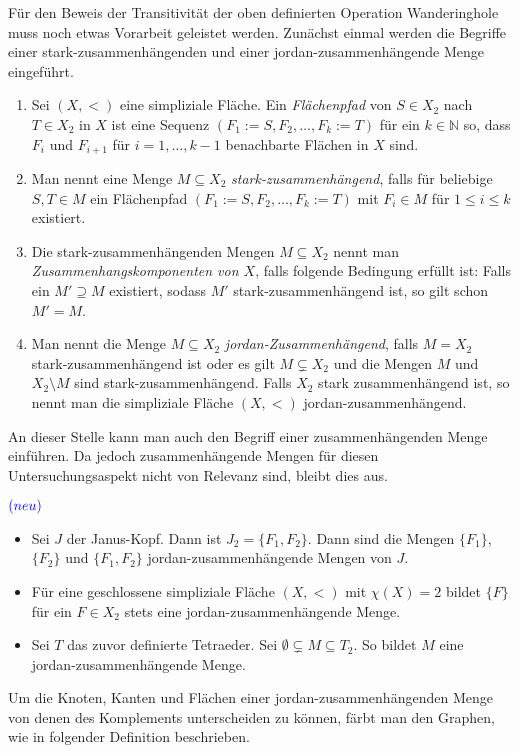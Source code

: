 \documentclass[12pt,titlepage]{article}
\begin{document}
Für den Beweis der Transitivität der oben definierten Operation Wanderinghole muss noch etwas Vorarbeit geleistet werden.
Zunächst einmal werden die Begriffe einer stark-zusammenhängenden und einer jordan-zusammenhängende Menge eingeführt.
\begin{definition} 

\begin{enumerate}$\textcolor{blue}{(neu)}$
\item Sei $(X,<)$ eine simpliziale Fläche. Ein \emph{Flächenpfad} von $S\in X_{2}$ nach $T \in X_{2}$ in $X$ ist eine Sequenz $(F_1:=S,F_{2},\ldots,F_{k}:=T)$ für ein $k \in \mathbb{N}$ so, dass $F_{i} $ und $F_{i+1}$ für $i=1,\ldots,k-1$ benachbarte Flächen in $X$ sind.
\item Man nennt eine Menge $M\subseteq X_2$  \emph{stark-zusammenhängend}, falls für beliebige $S,T \in M$ ein Flächenpfad $(F_{1}:=S,F_{2},\ldots,F_{k}:=T)$ mit $F_i \in M$ für $1\leq i \leq k$ existiert. 
 \item Die stark-zusammenhängenden Mengen $M\subseteq X_2$ nennt man \emph{Zusammenhangskomponenten von $X$}, falls folgende Bedingung erfüllt ist: Falls ein $M'\supseteq M$ existiert, sodass $M'$ stark-zusammenhängend ist, so gilt schon $M'=M$.
 \item Man nennt die Menge $M \subseteq X_2$ \emph{jordan-Zusammenhängend}, falls $M=X_2$ stark-zusammenhängend ist oder es gilt $M \subsetneq X_2$ und die Mengen $M$ und $X_2\setminus M$ sind stark-zusammenhängend. Falls $X_2$ stark zusammenhängend ist, so nennt man die simpliziale Fläche $(X,<)$ jordan-zusammenhängend.
\end {enumerate}
\end{definition}
An dieser Stelle kann man auch den Begriff einer zusammenhängenden Menge einführen. Da jedoch zusammenhängende Mengen für diesen Untersuchungsaspekt nicht von Relevanz sind, bleibt dies aus.

\begin{bsp}$\textcolor{blue}{(neu)}$
\begin{itemize}
\item Sei $J$ der Janus-Kopf. Dann ist $J_2=\{F_1,F_2\}$. Dann sind die Mengen $\{F_1\}$,$\{F_2\}$ und $\{F_1,F_2\}$ jordan-zusammenhängende Mengen von $J$.
\item Für eine geschlossene simpliziale Fläche $(X,<)$ mit $\chi(X)=2$ bildet $\{F\}$ für ein $F \in X_2$ stets eine jordan-zusammenhängende Menge.
\item Sei $T$ das zuvor definierte Tetraeder. Sei $\emptyset \subsetneq M \subseteq T_2$. So bildet $M$ eine jordan-zusammenhängende Menge.



\end{itemize}
\end{bsp}
Um die Knoten, Kanten und Flächen einer jordan-zusammenhängenden Menge von denen des Komplements unterscheiden zu können, färbt man den Graphen, wie in folgender Definition beschrieben.
\end{document}
